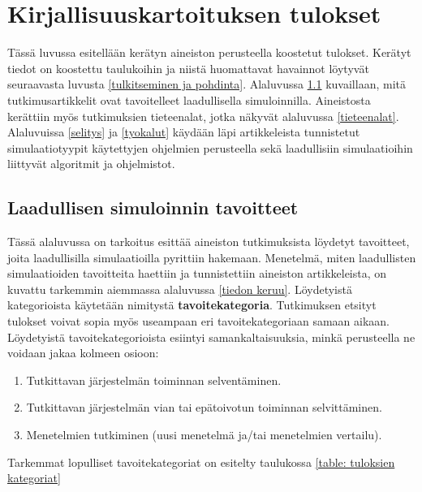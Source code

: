 \documentclass[utf8]{gradu3}
\begin{document}
\chapter{Kirjallisuuskartoituksen tulokset}
Tässä luvussa esitellään kerätyn aineiston perusteella koostetut tulokset.
Kerätyt tiedot on koostettu taulukoihin ja niistä huomattavat havainnot löytyvät
seuraavasta luvusta \ref{tulkitseminen ja pohdinta}.
Alaluvussa \ref{simulaatiotulokset} kuvaillaan,
mitä tutkimusartikkelit ovat tavoitelleet laadullisella simuloinnilla.
Aineistosta kerättiin myös tutkimuksien tieteenalat, jotka näkyvät alaluvussa
\ref{tieteenalat}.
Alaluvuissa \ref{selitys} ja \ref{tyokalut} käydään läpi artikkeleista tunnistetut simulaatiotyypit käytettyjen ohjelmien perusteella sekä laadullisiin simulaatioihin liittyvät algoritmit ja ohjelmistot. 

\section{Laadullisen simuloinnin tavoitteet} \label{simulaatiotulokset}
Tässä alaluvussa on tarkoitus esittää aineiston tutkimuksista 
löydetyt tavoitteet, joita laadullisilla simulaatioilla pyrittiin hakemaan.
Menetelmä, miten laadullisten simulaatioiden tavoitteita haettiin 
ja tunnistettiin aineiston artikkeleista, on kuvattu tarkemmin 
aiemmassa alaluvussa \ref{tiedon keruu}.
Löydetyistä kategorioista käytetään nimitystä \textbf{tavoitekategoria}.
Tutkimuksen etsityt tulokset voivat sopia myös useampaan eri tavoitekategoriaan
samaan aikaan. Löydetyistä tavoitekategorioista esiintyi samankaltaisuuksia, 
minkä perusteella ne voidaan jakaa kolmeen osioon:

\begin{enumerate}
    \item Tutkittavan järjestelmän toiminnan selventäminen.
    \item Tutkittavan järjestelmän vian tai epätoivotun toiminnan selvittäminen.
    \item Menetelmien tutkiminen (uusi menetelmä ja/tai menetelmien vertailu).
\end{enumerate}

Tarkemmat lopulliset tavoitekategoriat on esitelty taulukossa \ref{table: tuloksien kategoriat}
\end{document}
